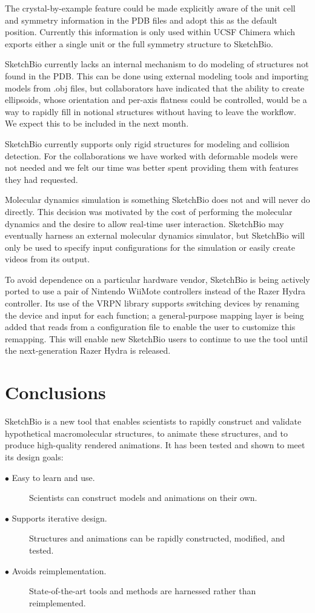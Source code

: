 \documentclass[twocolumn]{bmcart}%
\begin{document}
The crystal-by-example feature could be made explicitly aware of the unit cell and symmetry information in the PDB files and adopt this as the default position.
Currently this information is only used within UCSF Chimera which exports either a single unit or the full symmetry structure to SketchBio.

SketchBio currently lacks an internal mechanism to do modeling of structures not found in the PDB.
This can be done using external modeling tools and importing models from .obj files, but collaborators have indicated that the ability to create ellipsoids, whose orientation and per-axis flatness could be controlled, would be a way to rapidly fill in notional structures without having to leave the workflow.
We expect this to be included in the next month.

SketchBio currently supports only rigid structures for modeling and collision detection.
For the collaborations we have worked with deformable models were not needed and we felt our time was better spent providing them with features they had requested.

Molecular dynamics simulation is something SketchBio does not and will never do directly.
This decision was motivated by the cost of performing the molecular dynamics and the desire to allow real-time user interaction.
SketchBio may eventually harness an external molecular dynamics simulator, but SketchBio will only be used to specify input configurations for the simulation or easily create videos from its output.

To avoid dependence on a particular hardware vendor, SketchBio is being actively ported to use a pair of Nintendo WiiMote controllers instead of the Razer Hydra controller.
Its use of the VRPN library supports switching devices by renaming the device and input for each function; a general-purpose mapping layer is being added that reads from a configuration file to enable the user to customize this remapping.
This will enable new SketchBio users to continue to use the tool until the next-generation Razer Hydra is released.

\section*{Conclusions}
SketchBio is a new tool that enables scientists to rapidly construct and validate hypothetical macromolecular structures, to animate these structures, and to produce high-quality rendered animations.
It has been tested and shown to meet its design goals:
\begin{description}
  \item[$\bullet$ Easy to learn and use.] Scientists can construct models and animations on their own.
  \item[$\bullet$ Supports iterative design.] Structures and animations can be rapidly constructed, modified, and tested.
  \item[$\bullet$ Avoids reimplementation.] State-of-the-art tools and methods are harnessed rather than reimplemented.
\end{description}
\end{document}
